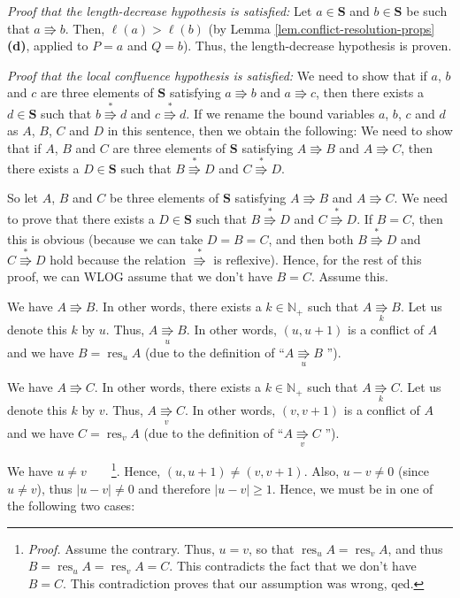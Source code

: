 \documentclass[numbers=enddot,12pt,final,onecolumn,notitlepage]{scrartcl}%
\theoremstyle{definition}
\begin{document}
\textit{Proof that the length-decrease hypothesis is satisfied:} Let
$a\in\mathbf{S}$ and $b\in\mathbf{S}$ be such that $a\Rrightarrow b$. Then,
$\ell\left(  a\right)  >\ell\left(  b\right)  $ (by Lemma
\ref{lem.conflict-resolution-props} \textbf{(d)}, applied to $P=a$ and $Q=b$).
Thus, the length-decrease hypothesis is proven.

\textit{Proof that the local confluence hypothesis is satisfied:} We need to
show that if $a$, $b$ and $c$ are three elements of $\mathbf{S}$ satisfying
$a\Rrightarrow b$ and $a\Rrightarrow c$, then there exists a $d\in\mathbf{S}$
such that $b\overset{\ast}{\Rrightarrow}d$ and $c\overset{\ast}{\Rrightarrow
}d$. If we rename the bound variables $a$, $b$, $c$ and $d$ as $A$, $B$, $C$
and $D$ in this sentence, then we obtain the following: We need to show that
if $A$, $B$ and $C$ are three elements of $\mathbf{S}$ satisfying
$A\Rrightarrow B$ and $A\Rrightarrow C$, then there exists a $D\in\mathbf{S}$
such that $B\overset{\ast}{\Rrightarrow}D$ and $C\overset{\ast}{\Rrightarrow
}D$.

So let $A$, $B$ and $C$ be three elements of $\mathbf{S}$ satisfying
$A\Rrightarrow B$ and $A\Rrightarrow C$. We need to prove that there exists a
$D\in\mathbf{S}$ such that $B\overset{\ast}{\Rrightarrow}D$ and
$C\overset{\ast}{\Rrightarrow}D$. If $B=C$, then this is obvious (because we
can take $D=B=C$, and then both $B\overset{\ast}{\Rrightarrow}D$ and
$C\overset{\ast}{\Rrightarrow}D$ hold because the relation $\overset{\ast
}{\Rrightarrow}$ is reflexive). Hence, for the rest of this proof, we can WLOG
assume that we don't have $B=C$. Assume this.

We have $A\Rrightarrow B$. In other words, there exists a $k\in\mathbb{N}_{+}$
such that $A\underset{k}{\Rrightarrow}B$. Let us denote this $k$ by $u$. Thus,
$A\underset{u}{\Rrightarrow}B$. In other words, $\left(  u,u+1\right)  $ is a
conflict of $A$ and we have $B=\operatorname*{res}\nolimits_{u}A$ (due to the
definition of \textquotedblleft$A\underset{u}{\Rrightarrow}B$%
\textquotedblright).

We have $A\Rrightarrow C$. In other words, there exists a $k\in\mathbb{N}_{+}$
such that $A\underset{k}{\Rrightarrow}C$. Let us denote this $k$ by $v$. Thus,
$A\underset{v}{\Rrightarrow}C$. In other words, $\left(  v,v+1\right)  $ is a
conflict of $A$ and we have $C=\operatorname*{res}\nolimits_{v}A$ (due to the
definition of \textquotedblleft$A\underset{v}{\Rrightarrow}C$%
\textquotedblright).

We have $u\neq v$\ \ \ \ \footnote{\textit{Proof.} Assume the contrary. Thus,
$u=v$, so that $\operatorname*{res}\nolimits_{u}A=\operatorname*{res}%
\nolimits_{v}A$, and thus $B=\operatorname*{res}\nolimits_{u}%
A=\operatorname*{res}\nolimits_{v}A=C$. This contradicts the fact that we
don't have $B=C$. This contradiction proves that our assumption was wrong,
qed.}. Hence, $\left(  u,u+1\right)  \neq\left(  v,v+1\right)  $. Also,
$u-v\neq0$ (since $u\neq v$), thus $\left\vert u-v\right\vert \neq0$ and
therefore $\left\vert u-v\right\vert \geq1$. Hence, we must be in one of the
following two cases:
\end{document}
